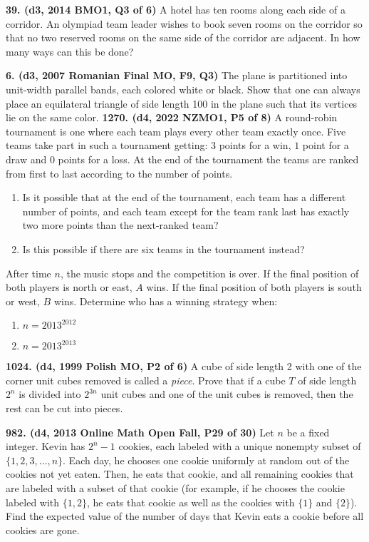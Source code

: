 \documentclass{article}
\begin{document}
        \textbf{39. (\color{red}d3\color{black}, 2014 BMO1, Q3 of 6)} A hotel has ten rooms along each side of a corridor. An olympiad team leader wishes to book seven rooms on the corridor so that no two reserved rooms on the same side of the corridor are adjacent. In how many ways can this be done?

        \textbf{6. (\color{red}d3\color{black}, 2007 Romanian Final MO, F9, Q3)} The plane is partitioned into unit-width parallel bands, each colored white or black. Show that one can always place an equilateral triangle of side length 100 in the plane such that its vertices lie on the same color.
        \textbf{1270. (\color{red}d4\color{black}, 2022 NZMO1, P5 of 8)} A round-robin tournament is one where each team plays every other team exactly once.  Five teams take part in such a tournament getting: \(3\) points for a win, \(1\) point for a draw and \(0\) points for a loss.  At the end of the tournament the teams are ranked from first to last according to the number of points.
        \begin{enumerate}
                \item Is it possible that at the end of the tournament, each team has a different number of points, and each team except for the team rank last has exactly two more points than the next-ranked team?
                \item Is this possible if there are six teams in the tournament instead?
        \end{enumerate}

        After time $n$, the music stops and the competition is over. If the final position of both players is north or east, $A$ wins. If the final position of both players is south or west, $B$ wins. Determine who has a winning strategy when:
        \begin{enumerate}
                \item $n = 2013^{2012}$
                \item $n = 2013^{2013}$
        \end{enumerate}

        \textbf{1024. (\color{red}d4\color{black}, 1999 Polish MO, P2 of 6)} A cube of side length 2 with one of the corner unit cubes removed is called a \emph{piece}. Prove that if a cube $T$ of side length $2^{n}$ is divided into $2^{3 n}$ unit cubes and one of the unit cubes is removed, then the rest can be cut into pieces.

        \textbf{982. (\color{red}d4\color{black}, 2013 Online Math Open Fall, P29 of 30)} Let $n$ be a fixed integer. Kevin has $2^n-1$ cookies, each labeled with a unique nonempty subset of $\{1,2,3, \ldots , n\}$. Each day, he chooses one cookie uniformly at random out of the cookies not yet eaten. Then, he eats that cookie, and all remaining cookies that are labeled with a subset of that cookie (for example, if he chooses the cookie labeled with $\{1,2\}$, he eats that cookie as well as the cookies with $\{1\}$ and $\{2\}$). Find the expected value of the number of days that Kevin eats a cookie before all cookies are gone.
\end{document}
